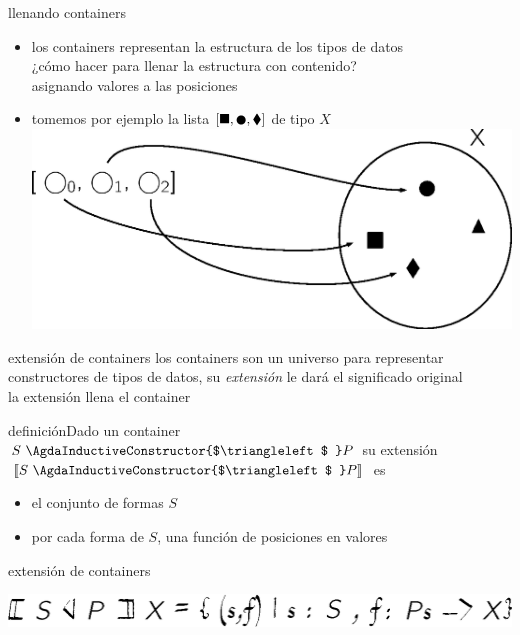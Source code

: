 \documentclass[9pt]{beamer}
\newcommand{\saltar}{\vspace{1ex}}
\begin{document}
\begin{frame}{llenando containers}
  \begin{itemize}
  \item los containers representan la \alert{estructura} de los tipos de datos\\ ¿cómo hacer para llenar la estructura con contenido? \\
    \pause
    \alert{asignando valores a las posiciones}\pause
  \item tomemos por ejemplo la lista $[\blacksquare, \newmoon, \blacklozenge]$ de tipo $X$\\ \saltar\saltar
    \includegraphics[scale=0.5]{img/listext.eps}
  \end{itemize}
\end{frame}

\begin{frame}{extensión de containers}
  los containers son un universo para representar constructores de tipos de datos, su \emph{extensión} le dará el significado original\\\saltar
  la extensión \alert{llena} el container\pause
    \begin{block}{definición}Dado un container $S\ \AgdaInductiveConstructor{$\triangleleft$ } P$ su \alert{extensión}
      $\llbracket S\ \AgdaInductiveConstructor{$\triangleleft$ } P \rrbracket $ es
      \begin{itemize}
      \item el conjunto de formas $S$
      \item por cada forma de $S$, una función de posiciones en valores
      \end{itemize}
      \end{block}
    \begin{exampleblock}{extensión de containers}
    \end{exampleblock}
    \begin{center}\includegraphics[scale=0.5]{img/ext.eps}
    \end{center}
\end{frame}
\end{document}
